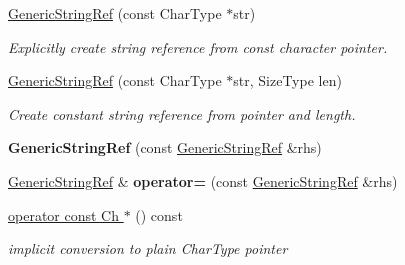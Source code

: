 \begin{DoxyCompactItemize}
\hyperlink{structGenericStringRef_a9e80d81d5ad49cf0fb4128ace8c548d9}{Generic\+String\+Ref} (const Char\+Type $\ast$str)
\begin{DoxyCompactList}\small\item\em Explicitly create string reference from {\ttfamily const} character pointer. \end{DoxyCompactList}\item 
\hyperlink{structGenericStringRef_a8b2c6a7fdc4da1e7055f7fdcf0ac517f}{Generic\+String\+Ref} (const Char\+Type $\ast$str, Size\+Type len)
\begin{DoxyCompactList}\small\item\em Create constant string reference from pointer and length. \end{DoxyCompactList}\item 
\mbox{\label{structGenericStringRef_ab049693082c0b8f5066c00212e780aec}} 
{\bfseries Generic\+String\+Ref} (const \hyperlink{structGenericStringRef}{Generic\+String\+Ref} \&rhs)
\item 
\mbox{\label{structGenericStringRef_a261406ab4ca7aa3fdd02fc3d152f0d0b}} 
\hyperlink{structGenericStringRef}{Generic\+String\+Ref} \& {\bfseries operator=} (const \hyperlink{structGenericStringRef}{Generic\+String\+Ref} \&rhs)
\item 
\mbox{\label{structGenericStringRef_a4e652ee3a398d0eb8ece1835d15274d0}} 
\hyperlink{structGenericStringRef_a4e652ee3a398d0eb8ece1835d15274d0}{operator const Ch $\ast$} () const
\begin{DoxyCompactList}\small\item\em implicit conversion to plain Char\+Type pointer \end{DoxyCompactList}\end{DoxyCompactItemize}
